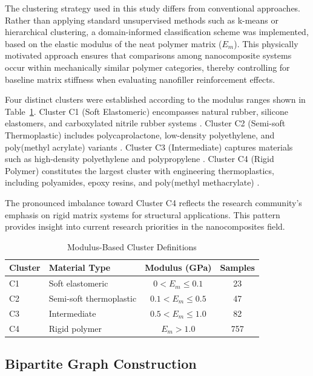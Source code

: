 \documentclass[conference]{IEEEtran}
\begin{document}
The clustering strategy used in this study differs from conventional approaches. Rather than applying standard unsupervised methods such as k-means or hierarchical clustering, a domain-informed classification scheme was implemented, based on the elastic modulus of the neat polymer matrix ($E_m$). This physically motivated approach ensures that comparisons among nanocomposite systems occur within mechanically similar polymer categories, thereby controlling for baseline matrix stiffness when evaluating nanofiller reinforcement effects.

Four distinct clusters were established according to the modulus ranges shown in Table~\ref{tab:clusters}. Cluster C1 (Soft Elastomeric) encompasses natural rubber, silicone elastomers, and carboxylated nitrile rubber systems \cite{5, 109}. Cluster C2 (Semi-soft Thermoplastic) includes polycaprolactone, low-density polyethylene, and poly(methyl acrylate) variants \cite{1, 6, 16}. Cluster C3 (Intermediate) captures materials such as high-density polyethylene and polypropylene \cite{77, 94, 122, 131}. Cluster C4 (Rigid Polymer) constitutes the largest cluster with engineering thermoplastics, including polyamides, epoxy resins, and poly(methyl methacrylate) \cite{80, 87, 92}.

The pronounced imbalance toward Cluster C4 reflects the research community's emphasis on rigid matrix systems for structural applications. This pattern provides insight into current research priorities in the nanocomposites field.

\begin{table}[htbp]
\caption{Modulus-Based Cluster Definitions}
\begin{center}
\begin{tabular}{@{}llcc@{}}
\toprule
Cluster & Material Type & Modulus (GPa) & Samples \\
\midrule
C1 & Soft elastomeric & $0 < E_m \leq 0.1$ & 23 \\
C2 & Semi-soft thermoplastic & $0.1 < E_m \leq 0.5$ & 47 \\
C3 & Intermediate & $0.5 < E_m \leq 1.0$ & 82 \\
C4 & Rigid polymer & $E_m > 1.0$ & 757 \\
\bottomrule
\end{tabular}
\label{tab:clusters}
\end{center}
\end{table}

\subsection{Bipartite Graph Construction}
\end{document}
